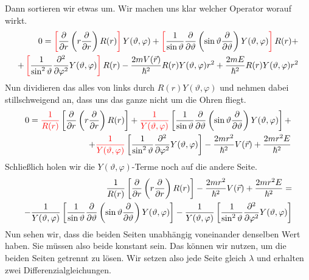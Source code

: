 \documentclass[a4paper,12pt,portrait]{book}
\numberwithin{equation}{section}
\begin{document}
Dann sortieren wir etwas um. Wir machen uns klar welcher Operator worauf wirkt.
\begin{align*}
0 = \color{red}\left[\color{black}\frac{\partial{}}{\partial{r}}\left(r\frac{\partial{}}{\partial{r}}\right)R(r)\color{red}\right]\color{black}Y(\vartheta,\varphi) + \color{red}\left[\color{black} \frac{1}{\sin\vartheta}\frac{\partial{}}{\partial{\vartheta}}\left(\sin\vartheta\frac{\partial{}}{\partial{\vartheta}}\right)Y(\vartheta,\varphi)\color{red}\right]\color{black} R(r)+  \\  + \color{red}\left[\color{black}\frac{1}{\sin^2\vartheta}\frac{\partial^2}{\partial\varphi^2}Y(\vartheta,\varphi)\color{red}\right]\color{black}R(r) - \frac{2mV(\vec{r})}{\hbar^2}R(r)Y(\vartheta,\varphi)r^2 + \frac{2mE}{\hbar^2}R(r)Y(\vartheta,\varphi)r^2
\end{align*}
Nun dividieren das alles von links durch $R(r)Y(\vartheta,\varphi)$ und nehmen dabei stillschweigend an, dass uns das ganze nicht um die Ohren fliegt.
\begin{align*}
0 = \color{red}\frac{1}{R(r)}\color{black}\left[\frac{\partial{}}{\partial{r}}\left(r\frac{\partial{}}{\partial{r}}\right)R(r)\right]  + \color{red}\frac{1}{Y(\vartheta,\varphi)}\color{black}\left[ \frac{1}{\sin\vartheta}\frac{\partial{}}{\partial{\vartheta}}\left(\sin\vartheta\frac{\partial{}}{\partial{\vartheta}}\right)Y(\vartheta,\varphi)\right]+  \\  + \color{red}\frac{1}{Y(\vartheta,\varphi)}\color{black}\left[\frac{1}{\sin^2\vartheta}\frac{\partial^2}{\partial\varphi^2}Y(\vartheta,\varphi)\right] - \frac{2mr^2}{\hbar^2}V(\vec{r}) + \frac{2mr^2E}{\hbar^2}
\end{align*}
Schließlich holen wir die $Y(\vartheta,\varphi)$-Terme noch auf die andere Seite.
\begin{align*}
\frac{1}{R(r)}\left[\frac{\partial{}}{\partial{r}}\left(r\frac{\partial{}}{\partial{r}}\right)R(r)\right] - \frac{2mr^2}{\hbar^2}V(\vec{r}) + \frac{2mr^2E}{\hbar^2} =\\ - \frac{1}{Y(\vartheta,\varphi)}\color{black}\left[ \frac{1}{\sin\vartheta}\frac{\partial{}}{\partial{\vartheta}}\left(\sin\vartheta\frac{\partial{}}{\partial{\vartheta}}\right)Y(\vartheta,\varphi)\right] -\frac{1}{Y(\vartheta,\varphi)}\color{black}\left[\frac{1}{\sin^2\vartheta}\frac{\partial^2}{\partial\varphi^2}Y(\vartheta,\varphi)\right]
\end{align*}
Nun sehen wir, dass die beiden Seiten unabhängig voneinander denselben Wert haben. Sie müssen also beide konstant sein. Das können wir nutzen, um die beiden Seiten getrennt zu lösen. Wir setzen also jede Seite gleich $\lambda$ und erhalten zwei Differenzialgleichungen.
\end{document}
